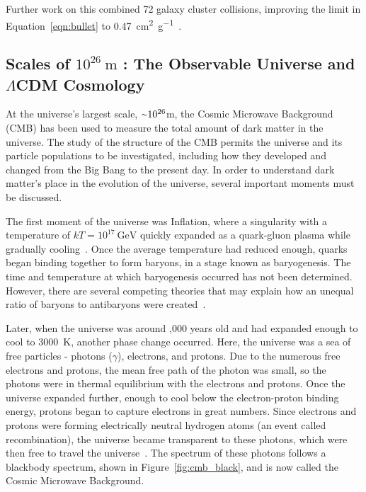 Further work on this combined 72 galaxy cluster collisions, improving the limit in Equation~\ref{eqn:bullet} to \SI{0.47}{cm^2 g^{-1}}~\cite{cluster_72}.


\subsection{Scales of $10^{26}\:\text{m}$ : The Observable Universe and $\Lambda$CDM Cosmology}\label{dm_universe}
At the universe's largest scale, $\nicetilde 10^{26}$m, the Cosmic Microwave Background (CMB) has been used to measure the total amount of dark matter in the universe.
The study of the structure of the CMB permits the universe and its particle populations to be investigated, including how they developed and changed from the Big Bang to the present day.
In order to understand dark matter's place in the evolution of the universe, several important moments must be discussed.

The first moment of the universe was Inflation, where a singularity with a temperature of $kT=10^{17}\:\textrm{GeV}$ quickly expanded as a quark-gluon plasma while gradually cooling~\cite{inflation0,inflation1,inflation2,inflation3}.
Once the average temperature had reduced enough, quarks began binding together to form baryons, in a stage known as baryogenesis.
The time and temperature at which baryogenesis occurred has not been determined.
However, there are several competing theories that may explain how an unequal ratio of baryons to antibaryons were created~\cite{baryogenesis1,baryogenesis2}.

Later, when the universe was around ,000 years old and had expanded enough to cool to \nicetilde\SI{3000}{K}, another phase change occurred.
Here, the universe was a sea of free particles - photons ($\gamma$), electrons, and protons.
Due to the numerous free electrons and protons, the mean free path of the photon was small, so the photons were in thermal equilibrium with the electrons and protons.
Once the universe expanded further, enough to cool below the electron-proton binding energy, protons began to capture electrons in great numbers.
Since electrons and protons were forming electrically neutral hydrogen atoms (an event called recombination), the universe became transparent to these photons, which were then free to travel the universe~\cite{planck2015,theEarlyUniverse,CMBFundamentals,CMBFlat}.
The spectrum of these photons follows a blackbody spectrum, shown in Figure~\ref{fig:cmb_black}, and is now called the Cosmic Microwave Background.

